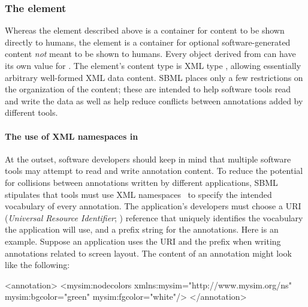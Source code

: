 \subsubsection{The  element}
\label{sec:annotation-use}

Whereas the  element described above is a container for
content to be shown directly to humans, the 
element is a container for optional software-generated content
\emph{not} meant to be shown to humans.  Every object derived
from \SBase can have its own value for .  The
element's content type is XML type , allowing essentially
arbitrary well-formed XML data content.  SBML places only a few restrictions on
the organization of the content; these are intended to help
software tools read and write the data as well as help reduce
conflicts between annotations added by different tools.


\paragraph{The use of XML namespaces in }


At the outset, software developers should keep in mind that
multiple software tools may attempt to read and write annotation
content.  To reduce the potential for collisions between
annotations written by different applications, SBML \thisLV
stipulates that tools must use XML namespaces~\citep{bray:1999} to
specify the intended vocabulary of every annotation.  The
application's developers must choose a URI (\emph{Universal
  Resource Identifier}; \citealt{harold:2001,w3c:2000}) reference
that uniquely identifies the vocabulary the application will use,
and a prefix string for the annotations.  Here is an example.
Suppose an application uses the URI 
and the prefix  when writing annotations related to
screen layout.  The content of an annotation might look like the
following:

\begin{example}
<annotation>
    <mysim:nodecolors xmlns:mysim="http://www.mysim.org/ns"
         mysim:bgcolor="green" mysim:fgcolor="white"/>
</annotation>
\end{example}

